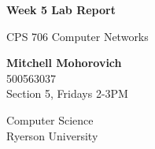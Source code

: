 \documentclass[12pt]{article}
\begin{document}
\begin{titlepage}
	\begin{center}
		\vspace*{1cm}

		\Huge
		\textbf{Week 5 Lab Report}

		\vspace{0.2cm}
		\LARGE
		CPS 706 Computer Networks

		\vspace{1.5cm}

		\textbf{Mitchell Mohorovich}\\
		\vspace{0.2cm}
		\Large
		500563037\\
		\Large
		Section 5, Fridays 2-3PM

		\vfill

		\vspace{0.8cm}

		\Large
		Computer Science\\
		Ryerson University\\
	\end{center}
\end{titlepage}
\end{document}
